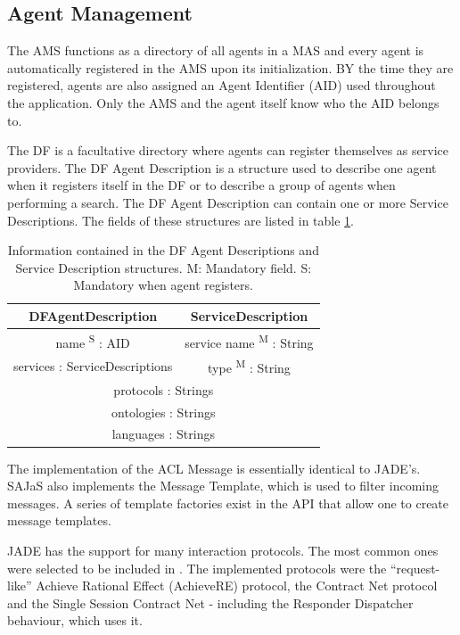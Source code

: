 \subsection{Agent Management}
The AMS functions as a directory of all agents in a MAS and every agent is automatically registered in the AMS upon its initialization. BY the time they are registered, agents are also assigned an Agent Identifier (AID) used throughout the application. Only the AMS and the agent itself know who the AID belongs to.

The DF is a facultative directory where agents can register themselves as service providers. The DF Agent Description is a structure used to describe one agent when it registers itself in the DF or to describe a group of agents when performing a search. The DF Agent Description can contain one or more Service Descriptions. The fields of these structures are listed in table \ref{tab:dfAgentDescription}.

\begin{table}[h]
	\normalsize
	\caption{Information contained in the DF Agent Descriptions and Service Description structures.
	M: Mandatory field. S: Mandatory when agent registers.}
	\label{tab:dfAgentDescription}
	\begin{center}
		\begin{tabular}{c|c}
		\hline
		\textbf{DFAgentDescription} & \textbf{ServiceDescription} \\
		\hline
		name \textsuperscript{S} : AID & service name \textsuperscript{M} : String \\
		\hline
		services : ServiceDescriptions & type \textsuperscript{M} : String \\
		\hline
		\multicolumn{2}{c}{protocols : Strings} \\
		\hline
		\multicolumn{2}{c}{ontologies : Strings} \\
		\hline
		\multicolumn{2}{c}{languages : Strings} \\
		\hline
		\end{tabular}
	\end{center}
\end{table} 

The implementation of the ACL Message is essentially identical to JADE's. SAJaS also implements the Message Template, which is used to filter incoming messages. A series of template factories exist in the API that allow one to create message templates. 

JADE has the support for many interaction protocols. The most common ones were selected to be included in \apiname{}.
The implemented protocols were the ``request-like'' Achieve Rational Effect (AchieveRE) protocol, the Contract Net protocol and the Single Session Contract Net - including the Responder Dispatcher behaviour, which uses it.

